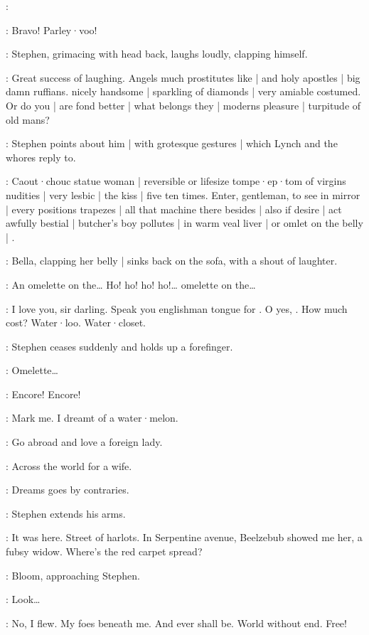 \Lynch:

\Whores:
Bravo!
Parley·voo!

:
Stephen,
grimacing with head back,
laughs loudly,
clapping himself.

\Stephen:
Great success of laughing.
Angels much prostitutes like |
and holy apostles |
big damn ruffians.
 nicely handsome |
sparkling of diamonds |
very amiable costumed.
Or do you |
are fond better |
what belongs they |
moderns pleasure |
turpitude of old mans?

:
Stephen points about him |
with grotesque gestures |
which Lynch and the whores reply to.

\Stephen:
Caout·chouc statue woman |
reversible or lifesize tompe·ep·tom of virgins nudities |
very lesbic |
the kiss |
five ten times.
Enter,
gentleman,
to see in mirror |
every positions trapezes |
all that machine there besides |
also if desire |
act awfully bestial |
butcher's boy pollutes |
in warm veal liver |
or omlet on the belly |
.

:
Bella,
clapping her belly |
sinks back on the sofa,
with a shout of laughter.

\Bella:
An omelette on the…
Ho!
ho!
ho!
ho!…
omelette on the…

\Stephen:
I love you,
sir darling.
Speak you englishman tongue for .
O yes,
.
How much cost?
Water·loo.
Water·closet.

:
Stephen ceases suddenly and holds up a forefinger.

\Bella:
Omelette…

\Whores:
Encore!
Encore!

\Stephen:
Mark me.
I dreamt of a water·melon.

\Zoe:
Go abroad and love a foreign lady.

\Lynch:
Across the world for a wife.

\Florry:
Dreams goes by contraries.

:
Stephen extends his arms.

\Stephen:
It was here.
Street of harlots.
In Serpentine avenue,
Beelzebub showed me her,
a fubsy widow.
Where's the red carpet spread?

:
Bloom,
approaching Stephen.

\Bloom:
Look…

\Stephen:
No,
I flew.
My foes beneath me.
And ever shall be.
World without end.
Free!

